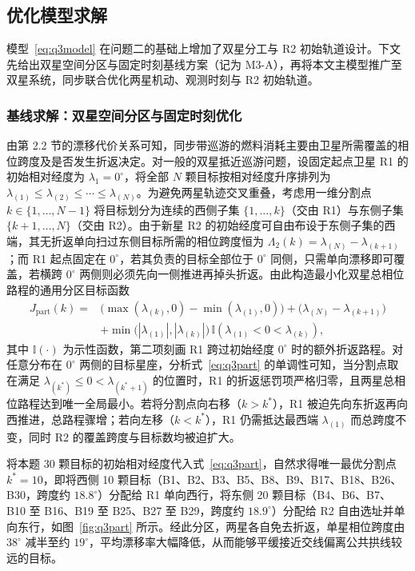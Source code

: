 \subsection{优化模型求解}

模型~\eqref{eq:q3model} 在问题二的基础上增加了双星分工与 R2 初始轨道设计。下文先给出双星空间分区与固定时刻基线方案（记为 M3-A），再将本文主模型推广至双星系统，同步联合优化两星机动、观测时刻与 R2 初始轨道。

\subsubsection{基线求解：双星空间分区与固定时刻优化}

由第 2.2 节的漂移代价关系可知，同步带巡游的燃料消耗主要由卫星所需覆盖的相位跨度及是否发生折返决定。对一般的双星抵近巡游问题，设固定起点卫星 R1 的初始相对经度为 $\lambda_1 = 0^\circ$，将全部 $N$ 颗目标按相对经度升序排列为 $\lambda_{(1)} \le \lambda_{(2)} \le \cdots \le \lambda_{(N)}$。为避免两星轨迹交叉重叠，考虑用一维分割点 $k \in \{1, \dots, N-1\}$ 将目标划分为连续的西侧子集 $\{1, \dots, k\}$（交由 R1）与东侧子集 $\{k+1, \dots, N\}$（交由 R2）。由于新星 R2 的初始经度可自由布设于东侧子集的西端，其无折返单向扫过东侧目标所需的相位跨度恒为 $\Lambda_2(k) = \lambda_{(N)} - \lambda_{(k+1)}$；而 R1 起点固定在 $0^\circ$，若其负责的目标全部位于 $0^\circ$ 同侧，只需单向漂移即可覆盖，若横跨 $0^\circ$ 两侧则必须先向一侧推进再掉头折返。由此构造最小化双星总相位路程的通用分区目标函数
\begin{equation}
  \begin{aligned}
    J_{\mathrm{part}}(k) ={} & \big(\max(\lambda_{(k)}, 0) - \min(\lambda_{(1)}, 0)\big) + \big(\lambda_{(N)} - \lambda_{(k+1)}\big) \\
    & + \min\big(|\lambda_{(1)}|, |\lambda_{(k)}|\big)\,\mathbb{I}(\lambda_{(1)} < 0 < \lambda_{(k)}) ,
  \end{aligned}
  \label{eq:q3part}
\end{equation}
其中 $\mathbb{I}(\cdot)$ 为示性函数，第二项刻画 R1 跨过初始经度 $0^\circ$ 时的额外折返路程。对任意分布在 $0^\circ$ 两侧的目标星座，分析式~\eqref{eq:q3part} 的单调性可知，当分割点取在满足 $\lambda_{(k^*)} \le 0 < \lambda_{(k^*+1)}$ 的位置时，R1 的折返惩罚项严格归零，且两星总相位路程达到唯一全局最小。若将分割点向右移（$k > k^*$），R1 被迫先向东折返再向西推进，总路程骤增；若向左移（$k < k^*$），R1 仍需抵达最西端 $\lambda_{(1)}$ 而总跨度不变，同时 R2 的覆盖跨度与目标数均被迫扩大。

将本题 30 颗目标的初始相对经度代入式~\eqref{eq:q3part}，自然求得唯一最优分割点 $k^* = 10$，即将西侧 10 颗目标（B1、B2、B3、B5、B8、B9、B17、B18、B26、B30，跨度约 $18.8^\circ$）分配给 R1 单向西行，将东侧 20 颗目标（B4、B6、B7、B10 至 B16、B19 至 B25、B27 至 B29，跨度约 $18.9^\circ$）分配给 R2 自由选址并单向东行，如图~\ref{fig:q3part} 所示。经此分区，两星各自免去折返，单星相位跨度由 $38^\circ$ 减半至约 $19^\circ$，平均漂移率大幅降低，从而能够平缓接近交线偏离公共拱线较远的目标。

